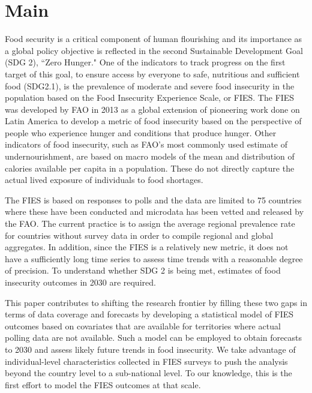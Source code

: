 \documentclass{article}
\begin{document}
\section{Main}
Food security is a critical component of human flourishing and its importance as a global policy objective is reflected in the second Sustainable Development Goal (SDG 2), ``Zero Hunger." One of the indicators to track progress on the first target of this goal, to ensure access by everyone to safe, nutritious and sufficient food (SDG2.1), is the prevalence of moderate and severe food insecurity in the population based on the Food Insecurity Experience Scale, or FIES. The FIES was developed by FAO in 2013 as a global extension of pioneering work done on Latin America to develop a metric of food insecurity based on the perspective of people who experience hunger and conditions that produce hunger. Other indicators of food insecurity, such as FAO's most commonly used estimate of undernourishment, are based on macro models of the mean and distribution of calories available per capita in a population. These do not directly capture the actual lived exposure of individuals to food shortages. 

The FIES is based on responses to polls and the data are limited to 75 countries where these have been conducted and microdata has been vetted and released by the FAO. The current practice is to assign the average regional prevalence rate for countries without survey data in order to compile regional and global aggregates. In addition, since the FIES is a relatively new metric, it does not have a sufficiently long time series to assess time trends with a reasonable degree of precision. To understand whether SDG 2 is being met, estimates of food insecurity outcomes in 2030 are required.

This paper contributes to shifting the research frontier by filling these two gaps in terms of data coverage and forecasts by developing a statistical model of FIES outcomes based on covariates that are available for territories where actual polling data are not available. Such a model can be employed to obtain forecasts to 2030 and assess likely future trends in food insecurity. We take advantage of individual-level characteristics collected in FIES surveys to push the analysis beyond the country level to a sub-national level. To our knowledge, this is the first effort to model the FIES outcomes at that scale.
\end{document}

